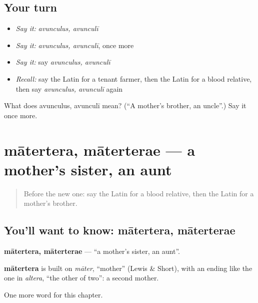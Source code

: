\subsection*{Your turn}
\begin{itemize}
\raggedright
  \item \emph{Say it:} \emph{avunculus, avunculī}
  \item \emph{Say it:} \emph{avunculus, avunculī}, once more
  \item \emph{Say it:} say \emph{avunculus, avunculī}
  \item \emph{Recall:} say the Latin for a tenant farmer, then the Latin for a blood relative, then say \emph{avunculus, avunculī} again
\end{itemize}

\begin{tcolorbox}[breakable,colback=teal!4,colframe=teal!35!black,title={Before you move on}]
What does avunculus, avunculī mean? (\textquotedblleft{}A mother's brother, an uncle\textquotedblright{}.) Say it once more.
\end{tcolorbox}
\section[mātertera, māterterae]{mātertera, māterterae — a mother's sister, an aunt}

\label{lesson:LA-C189-matertera}



\begin{quote}
Before the new one: say the Latin for a blood relative, then the Latin for a mother's brother.
\end{quote}

\subsection*{You'll want to know: mātertera, māterterae}
\textbf{mātertera, māterterae} — \textquotedblleft{}a mother's sister, an aunt\textquotedblright{}.

\begin{cousinweb}
\textbf{mātertera} is built on \emph{māter}, \textquotedblleft{}mother\textquotedblright{} (Lewis \& Short), with an ending like the one in \emph{altera}, \textquotedblleft{}the other of two\textquotedblright{}: a second mother.
\end{cousinweb}

\begin{grammarlens}[title={What you've built}]
One more word for this chapter.
\end{grammarlens}

